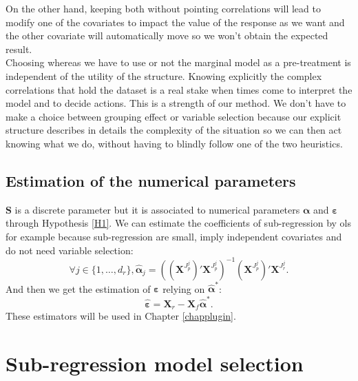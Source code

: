 \documentclass[12pt,a4paper]{report}
\begin{document}
	 On the other hand, keeping both without pointing correlations will lead to modify one of the covariates to impact the value of the response as we want and the other covariate will automatically move so we won't obtain the expected result.\\
	 
	  Choosing whereas we have to use or not the marginal model as a pre-treatment is independent of the utility of the structure. Knowing explicitly the complex correlations that hold the dataset is a real stake when times come to interpret the model and to  decide actions. This is a strength of our method. We don't have to make a choice between grouping effect or variable selection because our explicit structure describes in details the complexity of the situation so we can then act knowing what we do, without having to blindly follow one of the two heuristics.
\subsection{Estimation of the numerical parameters}
	$\boldsymbol{S}$ is a discrete parameter but it is associated to numerical parameters $\boldsymbol{\alpha}$ and $\boldsymbol{\varepsilon}$ through Hypothesis \ref{H1}.
	We can estimate the coefficients of sub-regression by {\sc ols} for example because sub-regression are small, imply independent covariates and do not need variable selection:
	\begin{equation}
	 \forall j \in \{1,\dots,d_r \}, \hat{\boldsymbol{\alpha}}_j=((\boldsymbol{X}^{J_p^j})' \boldsymbol{X}^{J_p^j})^{-1} (\boldsymbol{X}^{J_p^j})'\boldsymbol{X}^{J_r^j} .\label{estimalpha}
\end{equation}	 
And then we get the estimation of $\boldsymbol{\varepsilon}$ relying on $\hat{\boldsymbol{\alpha}}^*$:
	\begin{equation}
		\hat{\boldsymbol{\varepsilon}}=\boldsymbol{X}_r-\boldsymbol{X}_f\hat{\boldsymbol{\alpha}}^* .\label{epsilonchapeau}
	\end{equation}
	These estimators will be used in Chapter \ref{chapplugin}.
\section{Sub-regression model selection}	

%			
%			
%		
%		
%		
%		
\end{document}
